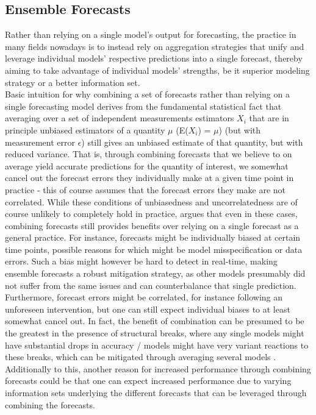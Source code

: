 \subsection{Ensemble Forecasts}
Rather than relying on a single model's output for forecasting, the practice in many fields nowadays is to instead rely on aggregation strategies that unify and leverage individual models' respective predictions into a single forecast, thereby aiming to take advantage of individual models' strengths, be it superior modeling strategy or a better information set.\\
Basic intuition for why combining a set of forecasts rather than relying on a single forecasting model derives from the fundamental statistical fact that averaging over a set of independent measurements estimators $X_i$ that are in principle unbiased estimators of a quantity $\mu$ (E($X_i$) = $\mu$) (but with measurement error $\epsilon$) still gives an unbiased estimate of that quantity, but with reduced variance. That is, through combining forecasts that we believe to on average yield accurate predictions for the quantity of interest, we somewhat cancel out the forecast errors they individually make at a given time point in practice - this of course assumes that the forecast errors they make are not correlated. While these conditions of unbiasedness and uncorrelatedness are of course unlikely to completely hold in practice, \cite{timmermann_chapter_2006} argues that even in these cases, combining forecasts still provides benefits over relying on a single forecast as a general practice. For instance, forecasts might be individually biased at certain time points, possible reasons for which might be  model misspecification or data errors. Such a bias might however be hard to detect in real-time, making ensemble forecasts a robust mitigation strategy, as other models presumably did not suffer from the same issues and can counterbalance that single prediction. Furthermore, forecast errors might be correlated, for instance following an unforeseen intervention, but one can still expect individual biases to at least somewhat cancel out. In fact, the benefit of combination can be presumed to be the greatest in the presence of structural breaks, where any single models might have substantial drops in accuracy / models might have very variant reactions to these breaks, which can be mitigated through averaging several models \citep{timmermann_chapter_2006}. Additionally to this, another reason for increased performance through combining forecasts could be that one can expect increased performance due to varying information sets underlying the different forecasts that can be leveraged through combining the forecasts.\\
